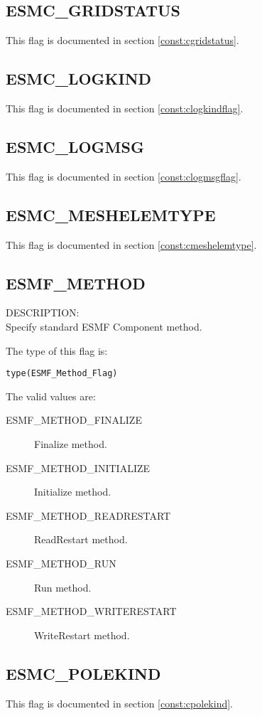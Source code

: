 \subsection{ESMC\_GRIDSTATUS}
This flag is documented in section \ref{const:cgridstatus}.

\subsection{ESMC\_LOGKIND}
This flag is documented in section \ref{const:clogkindflag}.

\subsection{ESMC\_LOGMSG}
This flag is documented in section \ref{const:clogmsgflag}.

\subsection{ESMC\_MESHELEMTYPE}
This flag is documented in section \ref{const:cmeshelemtype}.

\subsection{ESMF\_METHOD}
\label{const:cmethod}

{\sf DESCRIPTION:\\}  
Specify standard ESMF Component method.

The type of this flag is:

{\tt type(ESMF\_Method\_Flag)}

The valid values are:
\begin{description}
\item [ESMF\_METHOD\_FINALIZE]
      Finalize method.
\item [ESMF\_METHOD\_INITIALIZE]
      Initialize method.
\item [ESMF\_METHOD\_READRESTART]
      ReadRestart method.
\item [ESMF\_METHOD\_RUN]
      Run method.
\item [ESMF\_METHOD\_WRITERESTART]
      WriteRestart method.
\end{description}

\subsection{ESMC\_POLEKIND}
This flag is documented in section \ref{const:cpolekind}.

